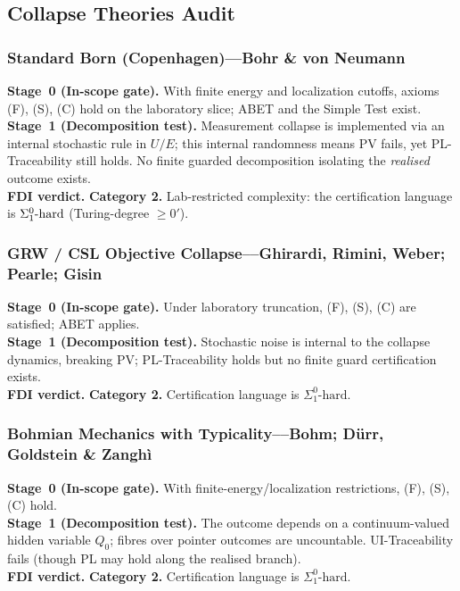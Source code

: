 \documentclass[12pt]{article}
\theoremstyle{definition}
\theoremstyle{plain}
\begin{document}
\subsection{Collapse Theories Audit}

\subsubsection{Standard Born (Copenhagen)––Bohr \& von Neumann}
\textbf{Stage~0 (In-scope gate).} With finite energy and localization cutoffs, axioms (F), (S), (C) hold on the laboratory slice; ABET and the Simple Test exist.\\
\textbf{Stage~1 (Decomposition test).} Measurement collapse is implemented via an internal stochastic rule in \(U/E\); this internal randomness means PV fails, yet PL-Traceability still holds. No finite guarded decomposition isolating the \emph{realised} outcome exists.\\
\textbf{FDI verdict.} \textbf{Category 2.} Lab-restricted complexity: the certification language is \(\Sigma^0_1\nobreak\text{-hard}\) (Turing-degree \(\geq 0'\)).  


\subsubsection{GRW / CSL Objective Collapse––Ghirardi, Rimini, Weber; Pearle; Gisin}
\textbf{Stage~0 (In-scope gate).} Under laboratory truncation, (F), (S), (C) are satisfied; ABET applies.\\
\textbf{Stage~1 (Decomposition test).} Stochastic noise is internal to the collapse dynamics, breaking PV; PL-Traceability holds but no finite guard certification exists.\\
\textbf{FDI verdict.} \textbf{Category 2.} Certification language is \(\Sigma^0_1\text{-hard}\).  

\subsubsection{Bohmian Mechanics with Typicality––Bohm; Dürr, Goldstein \& Zanghì}
\textbf{Stage~0 (In-scope gate).} With finite-energy/localization restrictions, (F), (S), (C) hold.\\
\textbf{Stage~1 (Decomposition test).} The outcome depends on a continuum-valued hidden variable \(Q_0\); fibres over pointer outcomes are uncountable. UI-Traceability fails (though PL may hold along the realised branch).\\
\textbf{FDI verdict.} \textbf{Category 2.} Certification language is \(\Sigma^0_1\text{-hard}\).  
\end{document}
